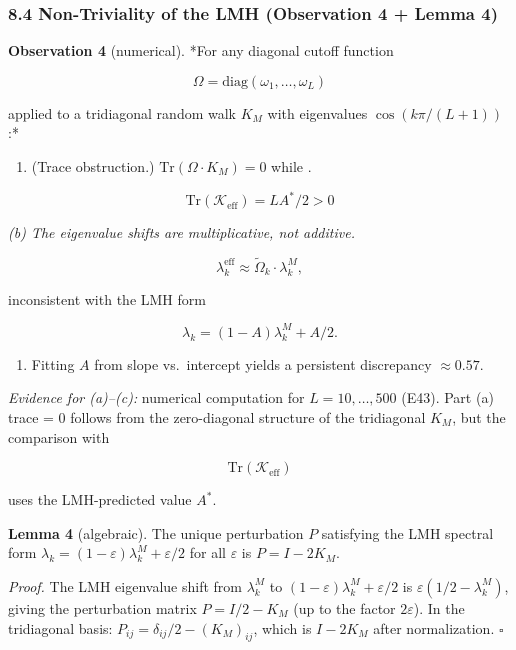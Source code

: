 \documentclass[
  11pt,
]{article}
\providecommand{\tightlist}{%
  \setlength{\itemsep}{0pt}\setlength{\parskip}{0pt}}
\begin{document}
\subsubsection{8.4 Non-Triviality of the LMH (Observation 4 + Lemma
4)}\label{non-triviality-of-the-lmh-observation-4-lemma-4}

\textbf{Observation 4} (numerical). *For any diagonal cutoff function

\[\Omega = \mathrm{diag}(\omega_1, \ldots, \omega_L)\]

applied to a tridiagonal random walk \(K_M\) with eigenvalues
\(\cos(k\pi/(L+1))\):*

\begin{enumerate}
\def\labelenumi{(\alph{enumi})}
\tightlist
\item
  (Trace obstruction.) \(\mathrm{Tr}(\Omega \cdot K_M) = 0\) while .
\end{enumerate}

\[\mathrm{Tr}(\mathcal{K}_{\mathrm{eff}}) = L A^{\ast}/2 > 0\]

\emph{(b) The eigenvalue shifts are multiplicative, not additive.}

\[\lambda_k^{\mathrm{eff}} \approx \tilde{\Omega}_k \cdot \lambda_k^M,\]

inconsistent with the LMH form

\[\lambda_k = (1-A)\lambda_k^M + A/2.\]

\begin{enumerate}
\def\labelenumi{(\alph{enumi})}
\setcounter{enumi}{2}
\tightlist
\item
  Fitting \(A\) from slope vs.~intercept yields a persistent discrepancy
  \(\approx 0.57\).
\end{enumerate}

\emph{Evidence for (a)--(c):} numerical computation for \(L = 10, \ldots, 500\)
(E43). Part (a) trace = 0 follows from the zero-diagonal structure of the
tridiagonal \(K_M\), but the comparison with

\[\mathrm{Tr}(\mathcal{K}_{\mathrm{eff}})\]

uses the LMH-predicted value \(A^{\ast}\).

\textbf{Lemma 4} (algebraic). The unique perturbation \(P\) satisfying the LMH
spectral form \(\lambda_k = (1-\varepsilon)\lambda_k^M + \varepsilon/2\) for all
\(\varepsilon\) is \(P = I - 2K_M\).

\emph{Proof.} The LMH eigenvalue shift from \(\lambda_k^M\) to
\((1-\varepsilon)\lambda_k^M + \varepsilon/2\) is
\(\varepsilon(1/2 - \lambda_k^M)\), giving the perturbation matrix
\(P = I/2 - K_M\) (up to the factor \(2\varepsilon\)). In the tridiagonal basis:
\(P_{ij} = \delta_{ij}/2 - (K_M)_{ij}\), which is \(I - 2K_M\) after
normalization. \(\square\)
\end{document}
